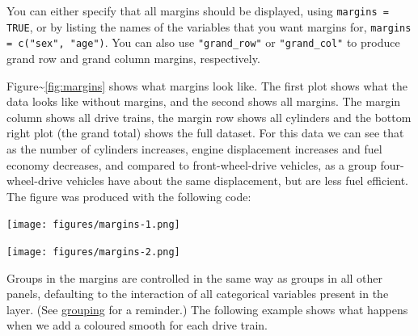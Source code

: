 You can either specify that all margins should be displayed, using
\texttt{margins = TRUE}, or by listing the names of the variables that
you want margins for, \texttt{margins = c("sex", "age")}. You can also
use \texttt{"grand\_row"} or \texttt{"grand\_col"} to produce grand row
and grand column margins, respectively.

Figure\textasciitilde{}\ref{fig:margins} shows what margins look like.
The first plot shows what the data looks like without margins, and the
second shows all margins. The margin column shows all drive trains, the
margin row shows all cylinders and the bottom right plot (the grand
total) shows the full dataset. For this data we can see that as the
number of cylinders increases, engine displacement increases and fuel
economy decreases, and compared to front-wheel-drive vehicles, as a
group four-wheel-drive vehicles have about the same displacement, but
are less fuel efficient. The figure was produced with the following
code:

\begin{Shaded}
\begin{Highlighting}[]
\StringTok{ } 
\StringTok{  }\NormalTok{(} \NormalTok{, } 
\StringTok{ }\StringTok{ }
\end{Highlighting}
\end{Shaded}

\texttt{[image: figures/margins-1.png]}

\begin{Shaded}
\begin{Highlighting}[]
\StringTok{ }\StringTok{ } 
\end{Highlighting}
\end{Shaded}

\texttt{[image: figures/margins-2.png]}

Groups in the margins are controlled in the same way as groups in all
other panels, defaulting to the interaction of all categorical variables
present in the layer. (See \hyperref[sub:grouping]{grouping} for a
reminder.) The following example shows what happens when we add a
coloured smooth for each drive train.

\begin{Shaded}
\begin{Highlighting}[]
\NormalTok{>}\StringTok{ } \StringTok{ }
\NormalTok{+}\StringTok{   }\NormalTok{(}\NormalTok{(}  \NormalTok{, } \StringTok{ }
\NormalTok{+}\StringTok{   }\StringTok{ } 
\end{Highlighting}
\end{Shaded}

